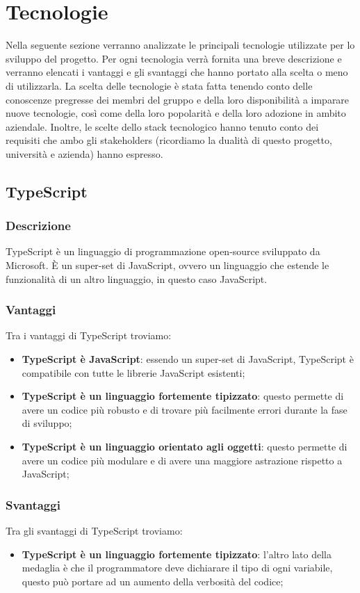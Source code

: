 \section*{Tecnologie}
Nella seguente sezione verranno analizzate le principali tecnologie utilizzate per lo sviluppo del progetto.
Per ogni tecnologia verrà fornita una breve descrizione e verranno elencati i vantaggi e gli svantaggi che hanno portato alla scelta o meno di utilizzarla.
La scelta delle tecnologie è stata fatta tenendo conto delle conoscenze pregresse dei membri del gruppo e della loro disponibilità a imparare nuove tecnologie, così
come della loro popolarità e della loro adozione in ambito aziendale. Inoltre, le scelte dello stack tecnologico hanno tenuto conto
dei requisiti che ambo gli stakeholders (ricordiamo la dualità di questo progetto, università e azienda) hanno espresso.

\subsection*{TypeScript}

\subsubsection*{Descrizione}
TypeScript è un linguaggio di programmazione open-source sviluppato da Microsoft.
È un super-set di JavaScript, ovvero un linguaggio che estende le funzionalità di un altro linguaggio, in questo caso JavaScript.

\subsubsection*{Vantaggi}
Tra i vantaggi di TypeScript troviamo:
\begin{itemize}
    \item \textbf{TypeScript è JavaScript}: essendo un super-set di JavaScript, TypeScript è compatibile con tutte le librerie JavaScript esistenti;
    \item \textbf{TypeScript è un linguaggio fortemente tipizzato}: questo permette di avere un codice più robusto e di trovare più facilmente errori durante la fase di sviluppo;
    \item \textbf{TypeScript è un linguaggio orientato agli oggetti}: questo permette di avere un codice più modulare e di avere una maggiore astrazione rispetto a JavaScript;
\end{itemize}

\subsubsection*{Svantaggi}
Tra gli svantaggi di TypeScript troviamo:
\begin{itemize}
    \item \textbf{TypeScript è un linguaggio fortemente tipizzato}: l'altro lato della medaglia è che il programmatore deve dichiarare il tipo di ogni variabile, questo può portare ad un aumento della verbosità del codice;
\end{itemize}


